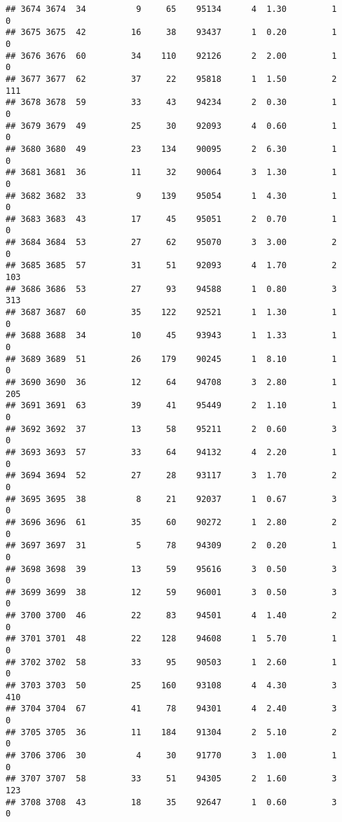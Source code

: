 \documentclass[
]{article}
\begin{document}
\begin{verbatim}
## 3674 3674  34          9     65    95134      4  1.30         1        0
## 3675 3675  42         16     38    93437      1  0.20         1        0
## 3676 3676  60         34    110    92126      2  2.00         1        0
## 3677 3677  62         37     22    95818      1  1.50         2      111
## 3678 3678  59         33     43    94234      2  0.30         1        0
## 3679 3679  49         25     30    92093      4  0.60         1        0
## 3680 3680  49         23    134    90095      2  6.30         1        0
## 3681 3681  36         11     32    90064      3  1.30         1        0
## 3682 3682  33          9    139    95054      1  4.30         1        0
## 3683 3683  43         17     45    95051      2  0.70         1        0
## 3684 3684  53         27     62    95070      3  3.00         2        0
## 3685 3685  57         31     51    92093      4  1.70         2      103
## 3686 3686  53         27     93    94588      1  0.80         3      313
## 3687 3687  60         35    122    92521      1  1.30         1        0
## 3688 3688  34         10     45    93943      1  1.33         1        0
## 3689 3689  51         26    179    90245      1  8.10         1        0
## 3690 3690  36         12     64    94708      3  2.80         1      205
## 3691 3691  63         39     41    95449      2  1.10         1        0
## 3692 3692  37         13     58    95211      2  0.60         3        0
## 3693 3693  57         33     64    94132      4  2.20         1        0
## 3694 3694  52         27     28    93117      3  1.70         2        0
## 3695 3695  38          8     21    92037      1  0.67         3        0
## 3696 3696  61         35     60    90272      1  2.80         2        0
## 3697 3697  31          5     78    94309      2  0.20         1        0
## 3698 3698  39         13     59    95616      3  0.50         3        0
## 3699 3699  38         12     59    96001      3  0.50         3        0
## 3700 3700  46         22     83    94501      4  1.40         2        0
## 3701 3701  48         22    128    94608      1  5.70         1        0
## 3702 3702  58         33     95    90503      1  2.60         1        0
## 3703 3703  50         25    160    93108      4  4.30         3      410
## 3704 3704  67         41     78    94301      4  2.40         3        0
## 3705 3705  36         11    184    91304      2  5.10         2        0
## 3706 3706  30          4     30    91770      3  1.00         1        0
## 3707 3707  58         33     51    94305      2  1.60         3      123
## 3708 3708  43         18     35    92647      1  0.60         3        0

\end{verbatim}
\end{document}
